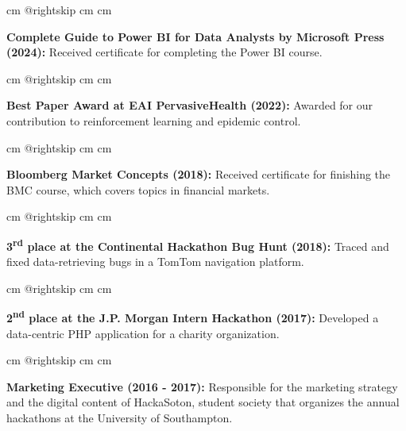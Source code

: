 \documentclass[10pt, letterpaper]{article}
\begin{document}
        \begingroup{} cm
        \advance\csname @rightskip cm
        \advance{} cm

        \textbf{Complete Guide to Power BI for Data Analysts by Microsoft Press (2024):} Received certificate for completing the Power BI course. \par\endgroup

        \vspace{0.2 cm}
        \begingroup{} cm
        \advance\csname @rightskip cm
        \advance{} cm

        \textbf{Best Paper Award at EAI PervasiveHealth (2022):} Awarded for our contribution to reinforcement learning and epidemic control. \par\endgroup

        \vspace{0.2 cm}
        \begingroup{} cm
        \advance\csname @rightskip cm
        \advance{} cm

        \textbf{Bloomberg Market Concepts (2018):} Received certificate for finishing the BMC course, which covers topics in financial markets. \par\endgroup

        \vspace{0.2 cm}
        \begingroup{} cm
        \advance\csname @rightskip cm
        \advance{} cm

        \textbf{3\textsuperscript{rd} place at the Continental Hackathon Bug Hunt (2018):} Traced and fixed data-retrieving bugs in a TomTom navigation platform. \par\endgroup

        \vspace{0.2 cm}
        \begingroup{} cm
        \advance\csname @rightskip cm
        \advance{} cm

        \textbf{2\textsuperscript{nd} place at the J.P. Morgan Intern Hackathon (2017):} Developed a data-centric PHP application for a charity organization. \par\endgroup

        \vspace{0.2 cm}
        \begingroup{} cm
        \advance\csname @rightskip cm
        \advance{} cm

        \textbf{Marketing Executive (2016 - 2017):} Responsible for the marketing strategy and the digital content of HackaSoton, student society that organizes the annual hackathons at the University of Southampton. \par\endgroup
\end{document}
